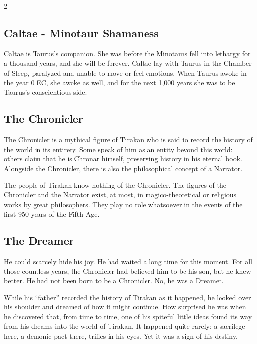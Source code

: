 \begin{multicols}{2}
{\subsection{Caltae - Minotaur Shamaness}\label{subsec:caltae-minotaurenschamanin}

Caltae is Taurus's companion. She was before the Minotaurs fell into lethargy for a thousand years, and she will be forever. Caltae lay with Taurus in the Chamber of Sleep, paralyzed and unable to move or feel emotions. When Taurus awoke in the year 0 EC, she awoke as well, and for the next 1,000 years she was to be Taurus's conscientious side.

\subsection{The Chronicler}\label{subsec:der-chronist}

The Chronicler is a mythical figure of Tirakan who is said to record the history of the world in its entirety. Some speak of him as an entity beyond this world; others claim that he is Chronar himself, preserving history in his eternal book. Alongside the Chronicler, there is also the philosophical concept of a Narrator.

The people of Tirakan know nothing of the Chronicler. The figures of the Chronicler and the Narrator exist, at most, in magico-theoretical or religious works by great philosophers. They play no role whatsoever in the events of the first 950 years of the Fifth Age.

\subsection{The Dreamer}\label{subsec:der-traumer}

He could scarcely hide his joy. He had waited a long time for this moment. For all those countless years, the Chronicler had believed him to be his son, but he knew better. He had not been born to be a Chronicler. No, he was a Dreamer.

While his ``father'' recorded the history of Tirakan as it happened, he looked over his shoulder and dreamed of how it might continue. How surprised he was when he discovered that, from time to time, one of his spiteful little ideas found its way from his dreams into the world of Tirakan. It happened quite rarely: a sacrilege here, a demonic pact there, trifles in his eyes. Yet it was a sign of his destiny.
}{}
\end{multicols}
